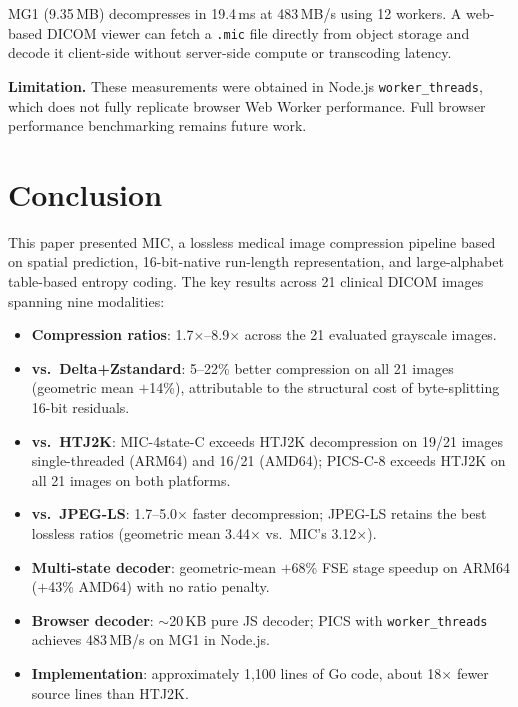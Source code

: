 \documentclass[journal]{IEEEtran}
\begin{document}
MG1 (9.35\,MB) decompresses in 19.4\,ms at 483\,MB/s using 12 workers.
A web-based DICOM viewer can fetch a \texttt{.mic} file directly from
object storage and decode it client-side without server-side compute or
transcoding latency.

\textbf{Limitation.} These measurements were obtained in Node.js
\texttt{worker\_threads}, which does not fully replicate browser Web Worker
performance. Full browser performance benchmarking remains future work.

\section{Conclusion}
\label{sec:conclusion}

This paper presented MIC, a lossless medical image compression pipeline based on
spatial prediction, 16-bit-native run-length representation, and large-alphabet
table-based entropy coding. The key results across 21 clinical DICOM images
spanning nine modalities:

\begin{itemize}
  \item \textbf{Compression ratios}: 1.7$\times$--8.9$\times$ across the 21
  evaluated grayscale images.

  \item \textbf{vs.\ Delta+Zstandard}: 5--22\% better compression on all 21
  images (geometric mean $+$14\%), attributable to the structural cost of
  byte-splitting 16-bit residuals.

  \item \textbf{vs.\ HTJ2K}: MIC-4state-C exceeds HTJ2K decompression on 19/21
  images single-threaded (ARM64) and 16/21 (AMD64); PICS-C-8 exceeds HTJ2K on
  all 21 images on both platforms.

  \item \textbf{vs.\ JPEG-LS}: 1.7--5.0$\times$ faster decompression; JPEG-LS
  retains the best lossless ratios (geometric mean 3.44$\times$ vs.\ MIC's
  3.12$\times$).

  \item \textbf{Multi-state decoder}: geometric-mean $+$68\% FSE stage
  speedup on ARM64 ($+$43\% AMD64) with no ratio penalty.

  \item \textbf{Browser decoder}: ${\sim}$20\,KB pure JS decoder; PICS with
  \texttt{worker\_threads} achieves 483\,MB/s on MG1 in Node.js.

  \item \textbf{Implementation}: approximately 1,100 lines of Go code, about
  18$\times$ fewer source lines than HTJ2K.
\end{itemize}
\end{document}
